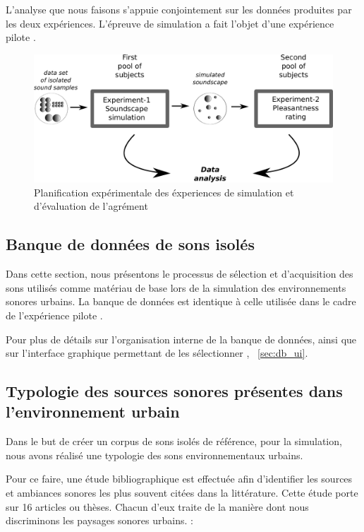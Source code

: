 L'analyse que nous faisons s'appuie conjointement sur les données produites par les deux expériences. L'épreuve de simulation a fait l'objet d'une expérience pilote \citep{lafay2013atiam,lafay2014new}.

\begin{figure}[t]
        \myfloatalign
        \includegraphics[width=.8\linewidth]{gfx/5}
        \caption{Planification expérimentale des éxperiences de simulation et d'évaluation de l'agrément}\label{fig:xp1_2}
\end{figure}



\subsection{Banque de données de sons isolés}

Dans cette section, nous présentons le processus de sélection et d'acquisition des sons utilisés comme matériau de base lors de la simulation des environnements sonores urbains. La banque de données est identique à celle utilisée dans le cadre de l'expérience pilote \citep{lafay2013atiam,lafay2014new}. 

Pour plus de détails sur l'organisation interne de la banque de données, ainsi que sur l'interface graphique permettant de les sélectionner  ,  ~\ref{sec:db_ui}.


\subsection{Typologie des sources sonores présentes dans l'environnement urbain}

Dans le but de créer un corpus de sons isolés de référence, pour la simulation, nous avons réalisé une typologie des sons environnementaux urbains. 

Pour ce faire, une étude bibliographique est effectuée afin d'identifier les sources et ambiances sonores les plus souvent citées dans la littérature. Cette étude porte sur 16 articles ou thèses. Chacun d'eux traite de la manière dont nous discriminons les paysages sonores urbains.   :

